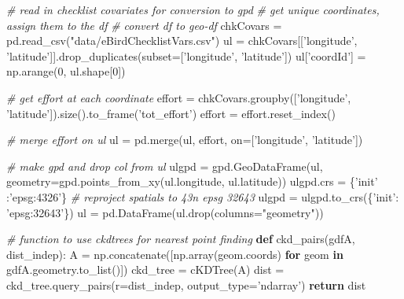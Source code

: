 \documentclass[]{article}
\newenvironment{Shaded}{}{}
\newcommand{\CommentTok}[1]{\textcolor[rgb]{0.38,0.63,0.69}{\textit{#1}}}
\newcommand{\ControlFlowTok}[1]{\textcolor[rgb]{0.00,0.44,0.13}{\textbf{#1}}}
\newcommand{\DecValTok}[1]{\textcolor[rgb]{0.25,0.63,0.44}{#1}}
\newcommand{\KeywordTok}[1]{\textcolor[rgb]{0.00,0.44,0.13}{\textbf{#1}}}
\newcommand{\NormalTok}[1]{#1}
\newcommand{\OperatorTok}[1]{\textcolor[rgb]{0.40,0.40,0.40}{#1}}
\newcommand{\StringTok}[1]{\textcolor[rgb]{0.25,0.44,0.63}{#1}}
\begin{document}
\begin{Shaded}
\begin{Highlighting}[]
\CommentTok{# read in checklist covariates for conversion to gpd}
\CommentTok{# get unique coordinates, assign them to the df}
\CommentTok{# convert df to geo-df}
\NormalTok{chkCovars }\OperatorTok{=}\NormalTok{ pd.read_csv(}\StringTok{"data/eBirdChecklistVars.csv"}\NormalTok{)}
\NormalTok{ul }\OperatorTok{=}\NormalTok{ chkCovars[[}\StringTok{'longitude'}\NormalTok{, }\StringTok{'latitude'}\NormalTok{]].drop_duplicates(subset}\OperatorTok{=}\NormalTok{[}\StringTok{'longitude'}\NormalTok{, }\StringTok{'latitude'}\NormalTok{])}
\NormalTok{ul[}\StringTok{'coordId'}\NormalTok{] }\OperatorTok{=}\NormalTok{ np.arange(}\DecValTok{0}\NormalTok{, ul.shape[}\DecValTok{0}\NormalTok{])}

\CommentTok{# get effort at each coordinate}
\NormalTok{effort }\OperatorTok{=}\NormalTok{ chkCovars.groupby([}\StringTok{'longitude'}\NormalTok{, }\StringTok{'latitude'}\NormalTok{]).size().to_frame(}\StringTok{'tot_effort'}\NormalTok{)}
\NormalTok{effort }\OperatorTok{=}\NormalTok{ effort.reset_index()}

\CommentTok{# merge effort on ul}
\NormalTok{ul }\OperatorTok{=}\NormalTok{ pd.merge(ul, effort, on}\OperatorTok{=}\NormalTok{[}\StringTok{'longitude'}\NormalTok{, }\StringTok{'latitude'}\NormalTok{])}

\CommentTok{# make gpd and drop col from ul}
\NormalTok{ulgpd }\OperatorTok{=}\NormalTok{ gpd.GeoDataFrame(ul, geometry}\OperatorTok{=}\NormalTok{gpd.points_from_xy(ul.longitude, ul.latitude))}
\NormalTok{ulgpd.crs }\OperatorTok{=}\NormalTok{ \{}\StringTok{'init'}\NormalTok{ :}\StringTok{'epsg:4326'}\NormalTok{\}}
\CommentTok{# reproject spatials to 43n epsg 32643}
\NormalTok{ulgpd }\OperatorTok{=}\NormalTok{ ulgpd.to_crs(\{}\StringTok{'init'}\NormalTok{: }\StringTok{'epsg:32643'}\NormalTok{\})}
\NormalTok{ul }\OperatorTok{=}\NormalTok{ pd.DataFrame(ul.drop(columns}\OperatorTok{=}\StringTok{"geometry"}\NormalTok{))}

\CommentTok{# function to use ckdtrees for nearest point finding}
\KeywordTok{def}\NormalTok{ ckd_pairs(gdfA, dist_indep):}
\NormalTok{    A }\OperatorTok{=}\NormalTok{ np.concatenate([np.array(geom.coords) }\ControlFlowTok{for}\NormalTok{ geom }\KeywordTok{in}\NormalTok{ gdfA.geometry.to_list()])}
\NormalTok{    ckd_tree }\OperatorTok{=}\NormalTok{ cKDTree(A)}
\NormalTok{    dist }\OperatorTok{=}\NormalTok{ ckd_tree.query_pairs(r}\OperatorTok{=}\NormalTok{dist_indep, output_type}\OperatorTok{=}\StringTok{'ndarray'}\NormalTok{)}
    \ControlFlowTok{return}\NormalTok{ dist}


\end{Highlighting}
\end{Shaded}
\end{document}
